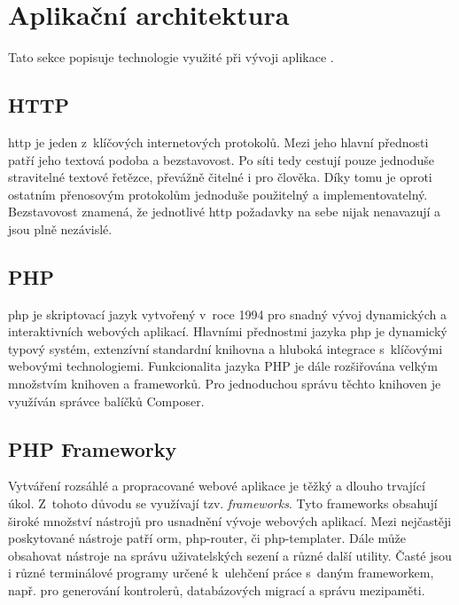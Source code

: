 \section{Aplikační architektura}
\label{sub:app-architecture}

Tato sekce popisuje technologie využité při vývoji aplikace \bso{}.

\subsection{HTTP}

\acrshort{http}\cite{http} je jeden z~klíčových internetových protokolů. Mezi jeho hlavní přednosti patří jeho textová podoba a bezstavovost. Po síti tedy cestují pouze jednoduše stravitelné textové řetězce, převážně čitelné i pro člověka. Díky tomu je oproti ostatním přenosovým protokolům jednoduše použitelný a implementovatelný. Bezstavovost znamená, že jednotlivé \acrshort{http} požadavky na sebe nijak nenavazují a jsou plně nezávislé.

\subsection{PHP}
\label{sub:php}

\acrshort{php}\cite{php} je skriptovací jazyk vytvořený v~roce 1994 pro snadný vývoj dynamických a interaktivních webových aplikací. Hlavními přednostmi jazyka \acrshort{php} je dynamický typový systém, extenzívní standardní knihovna a hluboká integrace s~klíčovými webovými technologiemi. Funkcionalita jazyka PHP je dále rozšiřována velkým množstvím knihoven a frameworků. Pro jednoduchou správu těchto knihoven je využíván správce balíčků Composer\cite{composer}.

\subsection{PHP Frameworky}

Vytváření rozsáhlé a propracované webové aplikace je těžký a dlouho trvající úkol. Z~tohoto důvodu se využívají tzv. \emph{\glspl{framework}}. Tyto \glspl{framework} obsahují široké množství nástrojů pro usnadnění vývoje webových aplikací. Mezi nejčastěji poskytované nástroje patří \Gls{orm}\cite{orm}, \gls{php-router}\cite{php-router}, či \gls{php-templater}\cite{php-templater}. Dále může obsahovat nástroje na správu uživatelských sezení a různé další utility. Časté jsou i různé terminálové programy určené k~ulehčení práce s~daným \gls{framework}em, např. pro generování kontrolerů, databázových migrací a správu mezipaměti.

